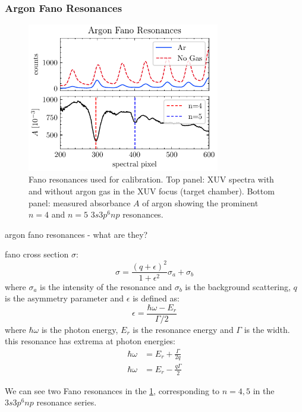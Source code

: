 \subsubsection{Argon Fano Resonances}

\begin{figure}
	\centering
	\includegraphics[width=0.75\textwidth]{figures/chap2/fano-calibration.pdf}
	\caption{Fano resonances used for calibration. Top panel: XUV spectra with and without argon gas in the XUV focus (target chamber). Bottom panel: measured absorbance $A$ of argon showing the prominent $n=4$ and $n=5$ $3s3p^6np$ resonances.}
	\label{fig:fano-calibration}
\end{figure}

argon fano resonances - what are they?

fano cross section $\sigma$:
\begin{equation}
\sigma = \frac{(q+\epsilon)^2}{1+\epsilon^2} \sigma_a + \sigma_b
\end{equation}
where $\sigma_a$ is the intensity of the resonance and $\sigma_b$ is the background scattering, $q$ is the asymmetry parameter and $\epsilon$ is defined as:
\begin{equation}
\epsilon = \frac{\hbar \omega - E_r}{\Gamma/2}
\end{equation}
where $\hbar \omega$ is the photon energy, $E_r$ is the resonance energy and $\Gamma$ is the width. this resonance has extrema at photon energies:
\begin{align}
\hbar \omega &= E_r + \frac{\Gamma}{2 q} \\
\hbar \omega &= E_r - \frac{q \Gamma}{2}
\end{align}

We can see two Fano resonances in the \cref{fig:fano-calibration}, corresponding to $n=4,5$ in the $3s3p^6np$ resonance series.

